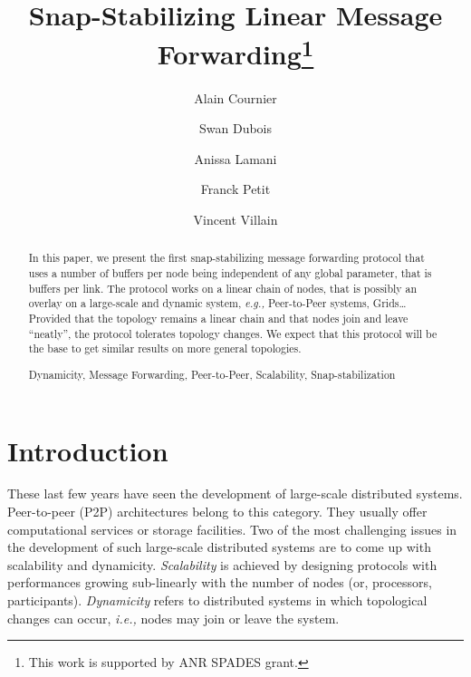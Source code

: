\documentclass{llncs}
\newcommand{\keywords}[1]{\par\addvspace\baselineskip
\noindent\keywordname\enspace\ignorespaces#1}
\newcommand{\eg}{\emph{e.g., }}
\newcommand{\ie}{\emph{i.e., }}
\begin{document}
\frontmatter          \pagestyle{headings}   

\mainmatter              \title{Snap-Stabilizing Linear Message Forwarding\thanks{This work is supported by ANR SPADES grant.}
}

\author{
  Alain Cournier \and  
  Swan Dubois \and 
  Anissa Lamani \and 
  Franck Petit \and 
  Vincent Villain 
}

   

\maketitle
\begin {abstract}

In this paper, we present the first snap-stabilizing message forwarding protocol that uses 
a number of buffers per node being independent of any global parameter, that is  buffers per 
link.  The protocol works on a linear chain of nodes, that is possibly an overlay on a large-scale and dynamic system,
\eg Peer-to-Peer systems, Grids\ldots  
Provided that the topology remains a linear chain and that nodes join and leave 
``neatly'', the protocol tolerates topology changes.  
We expect that this protocol will be the base to get similar results on more general topologies. 


\keywords {Dynamicity, Message Forwarding, Peer-to-Peer, Scalability, Snap-stabilization} 
\end {abstract}



\section{Introduction}

These last few years have seen the development of large-scale distributed systems.  
Peer-to-peer (P2P) architectures belong to this category.  They usually offer computational services or storage facilities.
Two of the most challenging issues in the development of such large-scale distributed 
systems are to come up with scalability and dynamicity.  {\em Scalability} is achieved by designing protocols 
with performances growing sub-linearly with the number of nodes (or, processors, participants).  {\em Dynamicity} refers to 
distributed systems in which topological changes can occur, \ie nodes may join or leave the system.
\end{document}
